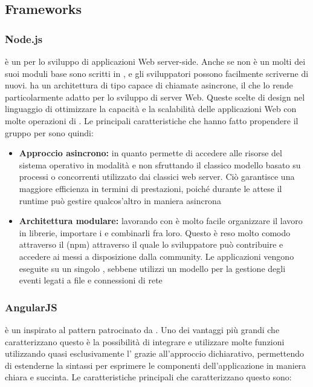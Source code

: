 \documentclass[12pt,a4paper]{article}
\begin{document}
\subsection{Frameworks}

\subsubsection{Node.js}\label{node.js}
 è un   per lo sviluppo di applicazioni Web server-side. Anche se  non è un   molti dei suoi moduli base  sono scritti in , e gli sviluppatori possono facilmente scriverne di nuovi.  ha un architettura di tipo  capace di chiamate  asincrone, il che lo rende particolarmente adatto per lo sviluppo di server Web. Queste scelte di design nel linguaggio di ottimizzare la capacità e la scalabilità delle applicazioni Web con molte operazioni di .
Le principali caratteristiche che hanno fatto propendere il gruppo per  sono quindi:

\begin{itemize}
	\item \textbf{Approccio asincrono:} in quanto permette di accedere alle risorse del sistema operativo in modalità  e non sfruttando il classico modello basato su processi o  concorrenti utilizzato dai classici web server. Ciò garantisce una maggiore efficienza in termini di prestazioni, poiché durante le attese il runtime può gestire qualcos’altro in maniera asincrona
	\item \textbf{Architettura modulare:} lavorando con  è molto facile organizzare il lavoro in librerie, importare i  e combinarli fra loro. Questo è reso molto comodo attraverso il  (npm) attraverso il quale lo sviluppatore può contribuire e
	accedere ai  messi a disposizione dalla community.
	Le applicazioni  vengono eseguite su un singolo , sebbene  utilizzi un modello  per la gestione degli eventi legati a file e connessioni di rete
\end{itemize}

\subsubsection{AngularJS}\label{angularjs}
 è un     inspirato al pattern  patrocinato da . Uno dei vantaggi più grandi che caratterizzano questo  è la possibilità di integrare e utilizzare molte funzioni utilizzando quasi esclusivamente l’ grazie all’approccio dichiarativo, permettendo di estenderne la sintassi per esprimere le componenti dell’applicazione in maniera chiara e succinta. Le caratteristiche principali che caratterizzano questo  sono:
\end{document}
